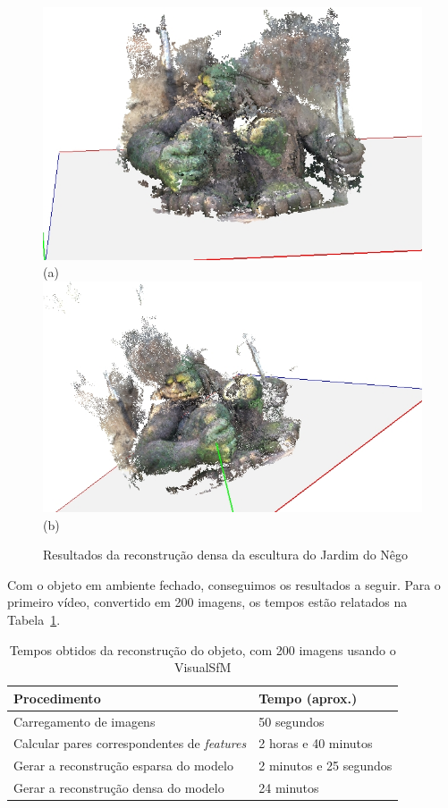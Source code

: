 \begin{figure}[!h]
	\centering
	\caption{Resultados da reconstrução densa da escultura do Jardim do Nêgo}
	\includegraphics[width=0.40\linewidth]{figs/guerreirovisualsfmdmr.jpg}(a)
	\includegraphics[width=0.50\linewidth]{figs/guerreirovisualsfmdmr2.jpg}(b)
		\label{fig:reconstrucaoDensaIndioVisualSFM}
\end{figure}



Com o objeto em ambiente fechado, conseguimos os resultados a seguir. 
Para o primeiro vídeo, convertido em 200 imagens, os tempos estão relatados na
Tabela~\ref{tab:temposSfM}.
\begin{table}
\caption{Tempos obtidos da reconstrução do objeto, com 200 imagens usando o VisualSfM}
\label{tab:temposSfM}
\begin{tabular}{|l|p{4.7cm}|}
\hline
Procedimento & Tempo (aprox.) \\ \hline
Carregamento de imagens & 50 segundos \\ \hline
Calcular pares correspondentes de \emph{features} & 2 horas e 40 minutos \\ \hline
Gerar a reconstrução esparsa do modelo & 2 minutos e 25 segundos \\ \hline
Gerar a reconstrução densa do modelo & 24 minutos \\ \hline
\end{tabular}
\end{table}

